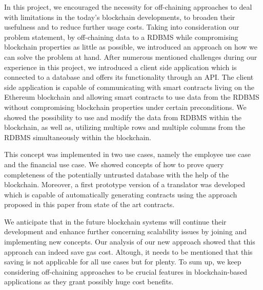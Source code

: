 
In this project, we encouraged the necessity for off-chaining approaches to deal with limitations in the today’s blockchain developments, to broaden their usefulness and to reduce further usage costs. 
Taking into consideration our problem statement, by off-chaining data to a RDBMS while compromising blockchain properties as little as possible, we introduced an approach on how we can solve the problem at hand.
 After numerous mentioned challenges during our experience in this project, we introduced a client side application which is connected to a database and offers its functionality through an API.
The client side application is capable of communicating with smart contracts living on the Ethereum blockchain and allowing smart contracts to use data from the RDBMS without compromising blockchain properties under certain preconditions. 
We showed the possibility to use and modify the data from RDBMS within the blockchain, as well as, utilizing multiple rows and multiple columns from the RDBMS simultaneously within the blockchain.

This concept was implemented in two use cases, namely the employee use case and the financial use case.
We showed concepts of how to prove query completeness of the potentially untrusted database with the help of the blockchain.
Moreover, a first prototype version of a translator was developed which is capable of automatically generating contracts using the approach proposed in this paper from state of the art contracts.


We anticipate that in the future blockchain systems will continue their development and enhance further concerning scalability issues by joining and implementing new concepts. 
Our analysis of our new approach showed that this approach can indeed save gas cost.
Altough, it needs to be mentioned that this saving is not applicable for all use cases but for plenty.
To sum up, we keep considering off-chaining approaches to be crucial features in blockchain-based applications as they grant possibly huge cost benefits.





